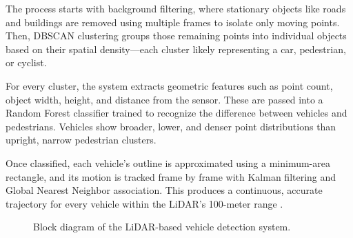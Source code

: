 \documentclass[11pt, a4paper]{report}
\begin{document}
The process starts with background filtering, where stationary objects like roads and buildings are removed using multiple frames to isolate only moving points. Then, DBSCAN clustering groups those remaining points into individual objects based on their spatial density---each cluster likely representing a car, pedestrian, or cyclist. \cite{lv2019lidar}

For every cluster, the system extracts geometric features such as point count, object width, height, and distance from the sensor. These are passed into a Random Forest classifier trained to recognize the difference between vehicles and pedestrians. Vehicles show broader, lower, and denser point distributions than upright, narrow pedestrian clusters.

Once classified, each vehicle's outline is approximated using a minimum-area rectangle, and its motion is tracked frame by frame with Kalman filtering and Global Nearest Neighbor association. This produces a continuous, accurate trajectory for every vehicle within the LiDAR's 100-meter range \cite{lv2019lidar}.

\begin{figure}[H]
\begin{center}
\end{center}
\caption{Block diagram of the LiDAR-based vehicle detection system.}
\label{fig:lidar_detection}
\end{figure}
\end{document}
